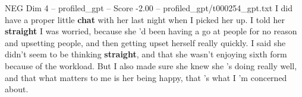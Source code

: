 \begin{textsample}{NEG Dim 4 – profiled\_gpt – Score -2.00 – profiled\_gpt/t000254\_gpt.txt}  \label{ex:f4_neg_010}
I did have a proper little \textbf{chat} with her last night when I picked her up.
I told her \textbf{straight} I was worried, because she ’d been having a go at people for no reason and upsetting people, and then getting upset herself really quickly.
I said she didn't seem to be thinking \textbf{straight}, and that she wasn't enjoying sixth form because of the workload.
But I also made sure she knew she ’s doing really well, and that what matters to me is her being happy, that ’s what I ’m concerned about.

\end{textsample}
